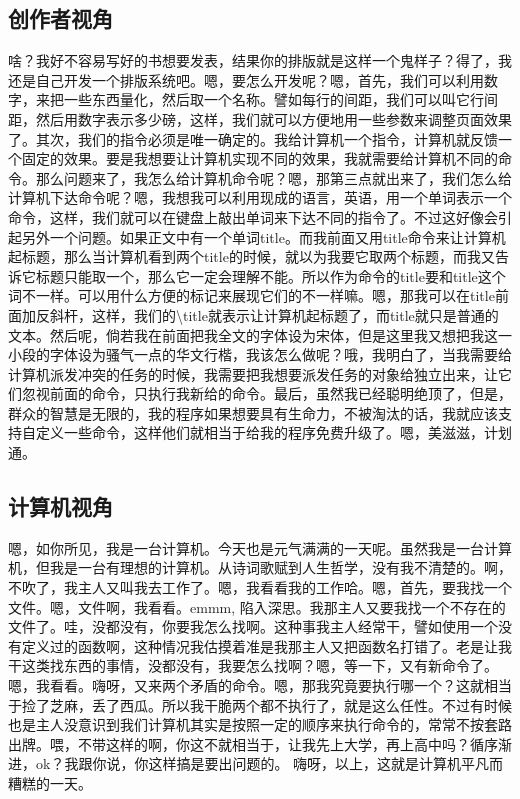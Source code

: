 \documentclass[UTF8,11pt,titlepage,a4paper]{ctexart}
\begin{document}
   \subsection{创作者视角}啥？我好不容易写好的书想要发表，结果你的排版就是这样一个鬼样子？得了，我还是自己开发一个排版系统吧。嗯，要怎么开发呢？嗯，首先，我们可以利用数字，来把一些东西量化，然后取一个名称。譬如每行的间距，我们可以叫它行间距，然后用数字表示多少磅，这样，我们就可以方便地用一些参数来调整页面效果了。其次，我们的指令必须是唯一确定的。我给计算机一个指令，计算机就反馈一个固定的效果。要是我想要让计算机实现不同的效果，我就需要给计算机不同的命令。那么问题来了，我怎么给计算机命令呢？嗯，那第三点就出来了，我们怎么给计算机下达命令呢？嗯，我想我可以利用现成的语言，英语，用一个单词表示一个命令，这样，我们就可以在键盘上敲出单词来下达不同的指令了。不过这好像会引起另外一个问题。如果正文中有一个单词title。而我前面又用title命令来让计算机起标题，那么当计算机看到两个title的时候，就以为我要它取两个标题，而我又告诉它标题只能取一个，那么它一定会理解不能。所以作为命令的title要和title这个词不一样。可以用什么方便的标记来展现它们的不一样嘛。嗯，那我可以在title前面加反斜杆，这样，我们的\textbackslash title就表示让计算机起标题了，而title就只是普通的文本。然后呢，倘若我在前面把我全文的字体设为宋体，但是这里我又想把我这一小段的字体设为骚气一点的华文行楷，我该怎么做呢？哦，我明白了，当我需要给计算机派发冲突的任务的时候，我需要把我想要派发任务的对象给独立出来，让它们忽视前面的命令，只执行我新给的命令。最后，虽然我已经聪明绝顶了，但是，群众的智慧是无限的，我的程序如果想要具有生命力，不被淘汰的话，我就应该支持自定义一些命令，这样他们就相当于给我的程序免费升级了。嗯，美滋滋，计划通。
   \par
   \subsection{计算机视角}嗯，如你所见，我是一台计算机。今天也是元气满满的一天呢。虽然我是一台计算机，但我是一台有理想的计算机。从诗词歌赋到人生哲学，没有我不清楚的。啊，不吹了，我主人又叫我去工作了。嗯，我看看我的工作哈。嗯，首先，要我找一个文件。嗯，文件啊，我看看。emmm, 陷入深思。我那主人又要我找一个不存在的文件了。哇，没都没有，你要我怎么找啊。这种事我主人经常干，譬如使用一个没有定义过的函数啊，这种情况我估摸着准是我那主人又把函数名打错了。老是让我干这类找东西的事情，没都没有，我要怎么找啊？嗯，等一下，又有新命令了。嗯，我看看。嗨呀，又来两个矛盾的命令。嗯，那我究竟要执行哪一个？这就相当于捡了芝麻，丢了西瓜。所以我干脆两个都不执行了，就是这么任性。不过有时候也是主人没意识到我们计算机其实是按照一定的顺序来执行命令的，常常不按套路出牌。喂，不带这样的啊，你这不就相当于，让我先上大学，再上高中吗？循序渐进，ok？我跟你说，你这样搞是要出问题的。
   嗨呀，以上，这就是计算机平凡而糟糕的一天。
   \par 
\end{document}
